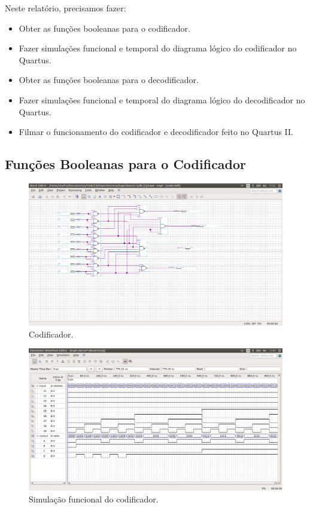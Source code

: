 \documentclass[12pt]{article}
\begin{document}
Neste relatório, precisamos fazer:
\begin{itemize}
	\item Obter as funções booleanas para o codificador.
	\item Fazer simulações funcional e temporal do diagrama lógico do codificador no Quartus. 
	\item Obter as funções booleanas para o decodificador.
	\item Fazer simulações funcional e temporal do diagrama lógico do decodificador no Quartus. 
	\item Filmar o funcionamento do codificador e decodificador feito no Quartus II.
\end{itemize}

\subsection{Funções Booleanas para o Codificador}
\label{sec:Cod}


\begin{figure}[H]
	\centering
	\includegraphics[width=1\textwidth]{coder.png}
	\caption{Codificador.}
	\label{fig:coder}
\end{figure}

\begin{figure}[H]
	\centering
	\includegraphics[width=1\textwidth]{functionalcoder.png}
	\caption{Simulação funcional do codificador.}
	\label{fig:funccoder}
\end{figure}
\end{document}
